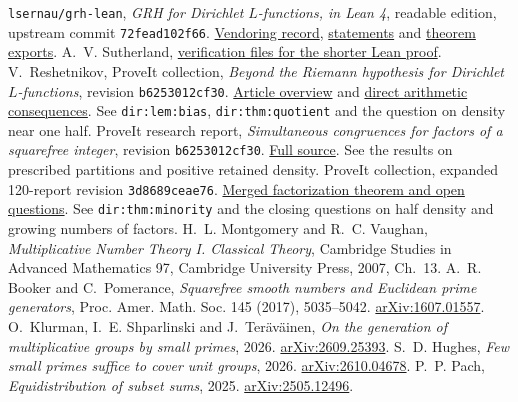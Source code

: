\documentclass[11pt,letterpaper]{article}
\newcommand{\srcbase}{https://github.com/VladimirReshetnikov/ProveIt/blob/b6253012cf30c80a989c871906e097a27f23a27c/Analysis/GeneralizedRiemannHypothesis}
\newcommand{\repo}[2]{\href{\srcbase/#1}{#2}}
\begin{document}
\begin{thebibliography}{10}
\setlength{\itemsep}{1pt}\setlength{\parsep}{0pt}
\footnotesize\raggedright
{} \texttt{lsernau/grh-lean}, \emph{GRH for Dirichlet \(L\)-functions, in Lean 4}, readable edition, upstream commit \texttt{72fead102f66}. \repo{vendor/grh-lean/README.md}{Vendoring record},
\repo{vendor/grh-lean/grh/src/Statements.lean}{statements} and
\repo{vendor/grh-lean/grh/src/Main.lean}{theorem exports}. A.~V. Sutherland, \href{https://math.mit.edu/~drew/shortgrh/}{verification files for the shorter Lean proof}.
 V.~Reshetnikov, ProveIt collection, \emph{Beyond the Riemann hypothesis for Dirichlet \(L\)-functions}, revision \texttt{b6253012cf30}. \repo{Article/README.md}{Article overview} and \repo{Article/sections/dir.tex}{direct arithmetic consequences}. See \texttt{dir:lem:bias}, \texttt{dir:thm:quotient} and the question on density near one half.
 ProveIt research report, \emph{Simultaneous congruences for factors of a squarefree integer}, revision \texttt{b6253012cf30}. \repo{Research/squarefree_factorizations/factorizations.tex}{Full source}. See the results on prescribed partitions and positive retained density.
 ProveIt collection, expanded 120-report revision \texttt{3d8689ceae76}. \href{https://github.com/VladimirReshetnikov/ProveIt/blob/3d8689ceae76501a5c50f67da37e85369aac4fb6/Analysis/GeneralizedRiemannHypothesis/Article/sections/dir.tex}{Merged factorization theorem and open questions}. See \texttt{dir:thm:minority} and the closing questions on half density and growing numbers of factors.
 H.~L. Montgomery and R.~C. Vaughan, \emph{Multiplicative Number Theory I. Classical Theory}, Cambridge Studies in Advanced Mathematics 97, Cambridge University Press, 2007, Ch.~13.
 A.~R. Booker and C.~Pomerance, \emph{Squarefree smooth numbers and Euclidean prime generators}, Proc. Amer. Math. Soc. 145 (2017), 5035--5042. \href{https://arxiv.org/abs/1607.01557}{arXiv:1607.01557}.
 O.~Klurman, I.~E. Shparlinski and J.~Ter\"av\"ainen, \emph{On the generation of multiplicative groups by small primes}, 2026. \href{https://arxiv.org/abs/2609.25393}{arXiv:2609.25393}.
 S.~D. Hughes, \emph{Few small primes suffice to cover unit groups}, 2026. \href{https://arxiv.org/abs/2610.04678}{arXiv:2610.04678}.
 P.~P. Pach, \emph{Equidistribution of subset sums}, 2025. \href{https://arxiv.org/abs/2505.12496}{arXiv:2505.12496}.
\end{thebibliography}
\end{document}
